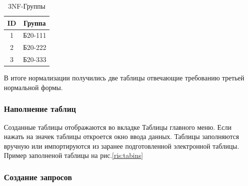 \documentclass[a4paper]{article}
\begin{document}
\begin{table}[h]
      \caption{3NF-Группы}
      \begin{center}\label{tab:3NFDONE_GROUPS}
      \begin{tabular}{|c|c|}
        \hline
        ID & Группа\\
        \hline
        1 & Б20-111\\
        2 & Б20-222\\
        3 & Б20-333\\
        \hline
      \end{tabular}
    \end{center}
  \end{table}

В итоге нормализации получились две таблицы отвечающие требованию третьей нормальной формы.

\subsubsection{Наполнение таблиц}
Созданные таблицы отображаются во вкладке Таблицы главного меню. Если нажать на значек таблицы откроется окно ввода данных. Таблицы заполняются вручную или импортируются из заранее подготовленной электронной таблицы. Пример заполненой таблицы на рис.\ref{ris:tabins}

\begin{figure}[h]
\end{figure}

\subsubsection{Создание запросов}
\end{document}
